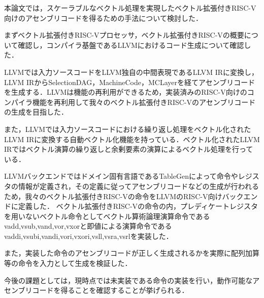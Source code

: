 
本論文では，スケーラブルなベクトル処理を実現したベクトル拡張付きRISC-V向けのアセンブリコードを得るための手法について検討した．

まずベクトル拡張付きRISC-Vプロセッサ，ベクトル拡張付きRISC-Vの概要について確認し，コンパイラ基盤であるLLVMにおけるコード生成について確認した．

LLVMでは入力ソースコードをLLVM独自の中間表現であるLLVM IRに変換し，LLVM IRからSelectionDAG，MachineCode，MCLayerを経てアセンブリコードを生成する．LLVMは機能の再利用ができるため，実装済みのRISC-V向けのコンパイラ機能を再利用して我々のベクトル拡張付きRISC-Vのアセンブリコードの生成を目指した．

また，LLVMでは入力ソースコードにおける繰り返し処理をベクトル化されたLLVM IRに変換する自動ベクトル化機能を持っている．ベクトル化されたLLVM IRではベクトル演算の繰り返しと余剰要素の演算によるベクトル処理を行っている．

LLVMバックエンドではドメイン固有言語であるTableGenによって命令やレジスタの情報が定義され，その定義に従ってアセンブリコードなどの生成が行われるため，我々のベクトル拡張付きRISC-Vの命令をLLVMのRISC-V向けバックエンドに定義した．
ベクトル拡張付きRISC-Vの命令の内，プレディケートレジスタを用いないベクトル命令としてベクトル算術論理演算命令であるvadd,vsub,vand,vor,vxorと即値による演算命令であるvaddi,vsubi,vandi,vori,vxori,vsll,vsra,vsrlを実装した．


また，実装した命令のアセンブリコードが正しく生成されるかを実際に配列加算等の命令を入力として生成を検証した．

今後の課題としては，現時点では未実装である命令の実装を行い，動作可能なアセンブリコードを得ることを確認することが挙げられる．
